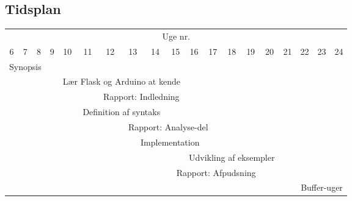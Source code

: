 \documentclass[a4paper,oneside, draft]{memoir}
\begin{document}
\appendix 

\begin{landscape}
\chapter{Tidsplan}
\begin{center}



\begin{tabular}{ccccccccccccccccccc}
\multicolumn{19}{c}{Uge nr.} \\
6 & 7 & 8 & 9 & 10 & 11 & 12 & 13 & 14 & 15 & 16 & 17 & 18 &
19 & 20 & 21 & 22 & 23 & 24\\ \hline \hline
\multicolumn{3}{c}{\cellcolor{black} \color{white}  Synopsis } \\  
& & \multicolumn{2}{c}{\cellcolor{cyan} \color{white}} &
\multicolumn{6}{l}{Lær Flask og Arduino at kende} \\
& & & \multicolumn{3}{c}{\cellcolor{lightgrey} \color{white} } &
\multicolumn{6}{l}{Rapport: Indledning} \\
& & & & &  \multicolumn{4}{c}{\cellcolor{magenta} \color{white} Definition af
  syntaks} \\
& & & & & \multicolumn{9}{c}{\cellcolor{grey} \color{white} Rapport: Analyse-del} \\

& & & & & & \multicolumn{7}{c}{\cellcolor{blue} \color{white} Implementation} \\
\multicolumn{10}{r}{} & \multicolumn{5}{c}{\cellcolor{red} Udvikling
  af eksempler}
 \\
\multicolumn{14}{r}{Rapport: Afpudsning} & \multicolumn{2}{c}{\cellcolor{yellow}}
 \\
\multicolumn{16}{r}{} & \multicolumn{3}{c}{\cellcolor{green} Buffer-uger} \\  
\end{tabular}
\end{center}
\end{landscape}



\end{document}
